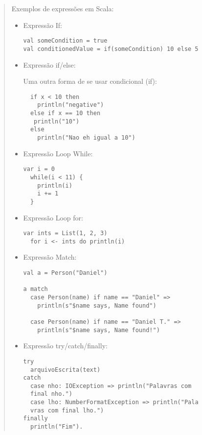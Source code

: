 \begin{quote}
Exemplos de expressões em Scala:
\begin{itemize}

  \item Expressão If:

\begin{lstlisting}
val someCondition = true
val conditionedValue = if(someCondition) 10 else 5
\end{lstlisting}

  \item Expressão if/else:

Uma outra forma de se usar condicional {\color{red}(if)}:

\begin{lstlisting}
  if x < 10 then
    println("negative")
  else if x == 10 then
   println("10")
  else
    println("Nao eh igual a 10")
\end{lstlisting}

\item Expressão Loop While:

\begin{lstlisting}
var i = 0
  while(i < 11) {
    println(i)
    i += 1
  }
\end{lstlisting}

\item Expressão Loop for:


\begin{lstlisting}
var ints = List(1, 2, 3)
  for i <- ints do println(i)
\end{lstlisting}


\item Expressão Match:

\begin{lstlisting}
val a = Person("Daniel")

a match
  case Person(name) if name == "Daniel" =>
    println(s"$name says, Name found")

  case Person(name) if name == "Daniel T." =>
    println(s"$name says, Name found!")
\end{lstlisting}

\item Expressão  try/catch/finally:
\begin{lstlisting}
try
  arquivoEscrita(text)
catch
  case nho: IOException => println("Palavras com
  final nho.")
  case lho: NumberFormatException => println("Pala
  vras com final lho.")
finally
  println("Fim").

\end{lstlisting}





\end{itemize}
\end{quote}
